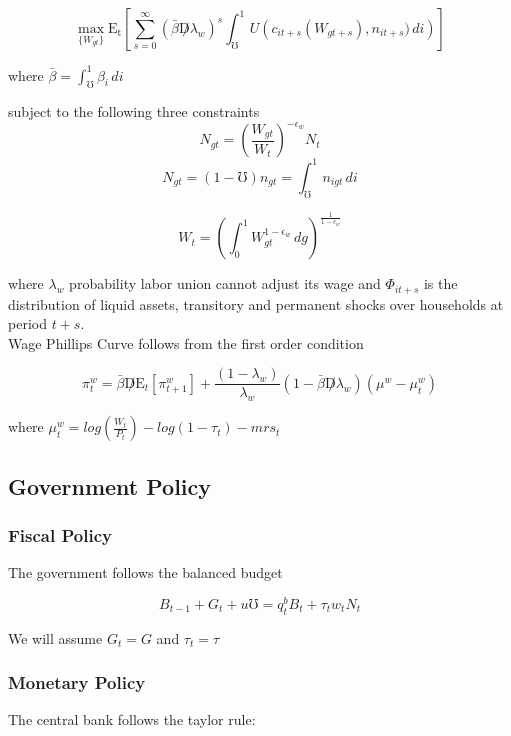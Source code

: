 \documentclass[titlepage]{\econtex}\providecommand{\texname}{BufferStockTheory}
\begin{document}
$$ \max_{\{W_{gt}\}} \mathrm{E_{t}}\left[\sum_{s=0}^{\infty} (\bar{\beta} \not D \lambda_{w})^{s} \int_{\mho}^{1}  U\left (c_{it+s}(W_{gt+s}), n_{i t+s}) \, di \right)\right] $$

where $\bar{\beta} = \int_{\mho}^{1} \beta_{i} \, di$

subject to the following three constraints $$ N_{gt} = \left(\frac{W_{gt}}{W_{t}}\right)^{-\epsilon_{w}} N_{t} $$
$$  N_{gt} = (1-\mho) \mathit{n}_{gt} = \int_{\mho}^{1} n_{igt}\,di $$ 

$$ W_{t} = \left(\int_{0}^{1} W_{gt}^{1-\epsilon_{w}}\,dg\right)^{\frac{1}{1-\epsilon_{w}}}$$

where $\lambda_{w}$ probability labor union cannot adjust its wage and $\Phi_{it+s}$ is the distribution of  liquid assets, transitory and permanent shocks over households at period $t+s$. \\


Wage Phillips Curve follows from the first order condition


$$ \pi_{t}^{w} =   \bar{\beta} \not D  \mathrm{E}_{t} \left[ \pi_{t+1}^{w}\right] + \frac{(1-\lambda_{w})}{\lambda_{w}} (1- \bar{\beta} \not D \lambda_{w}) (\mu^{w} - \mu_{t}^{w})$$

where $\mu_{t}^{w} = log\left( \frac{W_{t}}{P_{t}}\right)  - log\left(1 -\tau_{t}\right) - mrs_{t}$


\hypertarget{Government Policy}{}
\subsection{Government Policy}



\hypertarget{Fiscal Policy}{}
\subsubsection{Fiscal Policy}

The government follows the balanced budget

$$ B_{t-1} + G_{t} + \mathit{u} \mho =   q^{b}_{t} B_{t} +  \tau_{t} w_{t} N_{t} $$ 

We will assume $ G_{t} = G$ and $ \tau_{t} = \tau$

\hypertarget{Monetary Policy}{}
\subsubsection{Monetary Policy}


The central bank follows the taylor rule: 
\end{document}

